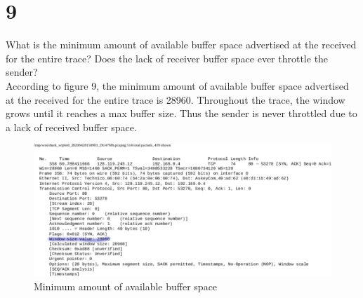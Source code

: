 \documentclass{article}
\begin{document}
\section*{9}
What is the minimum amount of available buffer space advertised at the received
for the entire trace? Does the lack of receiver buffer space ever throttle the
sender?\\
\newline According to figure 9, the minimum amount of available buffer space advertised at the received
for the entire trace is 28960.  Throughout the trace, the window grows until it reaches a max buffer size.  Thus the sender is never throttled due to a lack of received buffer space.\\
\begin{figure}[h!]
\centering
\includegraphics[scale=0.5]{Q9.pdf}
\caption{Minimum amount of available buffer space}
\end{figure}
\clearpage
\end{document}

